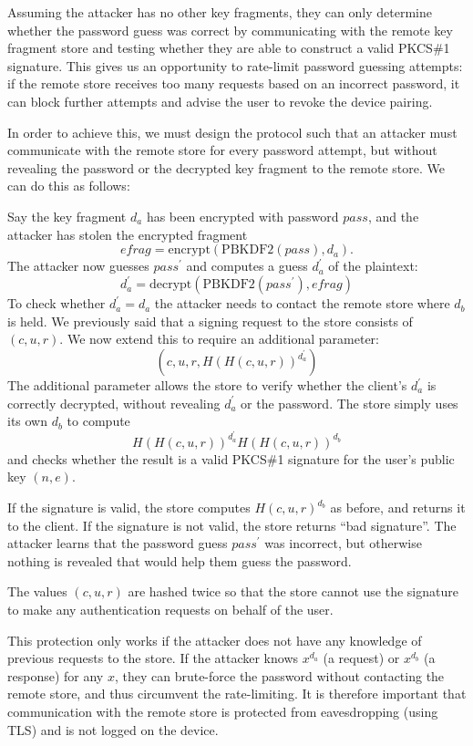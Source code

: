 Assuming the attacker has no other key fragments, they can only determine whether the password guess
was correct by communicating with the remote key fragment store and testing whether they are able to
construct a valid PKCS\#1 signature. This gives us an opportunity to rate-limit password guessing
attempts: if the remote store receives too many requests based on an incorrect password, it can
block further attempts and advise the user to revoke the device pairing.

In order to achieve this, we must design the protocol such that an attacker must communicate with
the remote store for every password attempt, but without revealing the password or the decrypted key
fragment to the remote store. We can do this as follows:

Say the key fragment $d_a$ has been encrypted with password $\mathit{pass}$, and the attacker has
stolen the encrypted fragment
$$\mathit{efrag} = \mathrm{encrypt}(\mathrm{PBKDF2}(\mathit{pass}), d_a).$$
The attacker now guesses $\mathit{pass}^\prime$ and computes a guess $d_a^\prime$ of the plaintext:
$$d_a^\prime = \mathrm{decrypt}(\mathrm{PBKDF2}(\mathit{pass}^\prime), \mathit{efrag})$$
To check whether $d_a^\prime = d_a$ the attacker needs to contact the remote store where $d_b$ is
held. We previously said that a signing request to the store consists of $(c, u, r)$. We now extend
this to require an additional parameter:
$$\left(c, u, r, H(H(c, u, r))^{d_a^\prime}\right)$$
The additional parameter allows the store to verify whether the client's $d_a^\prime$ is correctly
decrypted, without revealing $d_a^\prime$ or the password. The store simply uses its own $d_b$ to
compute $$H(H(c, u, r))^{d_a^\prime}H(H(c, u, r))^{d_b}$$ and checks whether the result is a valid
PKCS\#1 signature for the user's public key $(n, e)$.

If the signature is valid, the store computes $H(c, u, r)^{d_b}$ as before, and returns it to the
client. If the signature is not valid, the store returns ``bad signature''. The attacker learns that
the password guess $\mathit{pass}^\prime$ was incorrect, but otherwise nothing is revealed that
would help them guess the password.

The values $(c, u, r)$ are hashed twice so that the store cannot use the signature to make any
authentication requests on behalf of the user.

This protection only works if the attacker does not have any knowledge of previous requests to the
store. If the attacker knows $x^{d_a}$ (a request) or $x^{d_b}$ (a response) for any $x$, they can
brute-force the password without contacting the remote store, and thus circumvent the rate-limiting.
It is therefore important that communication with the remote store is protected from eavesdropping
(using TLS) and is not logged on the device.

